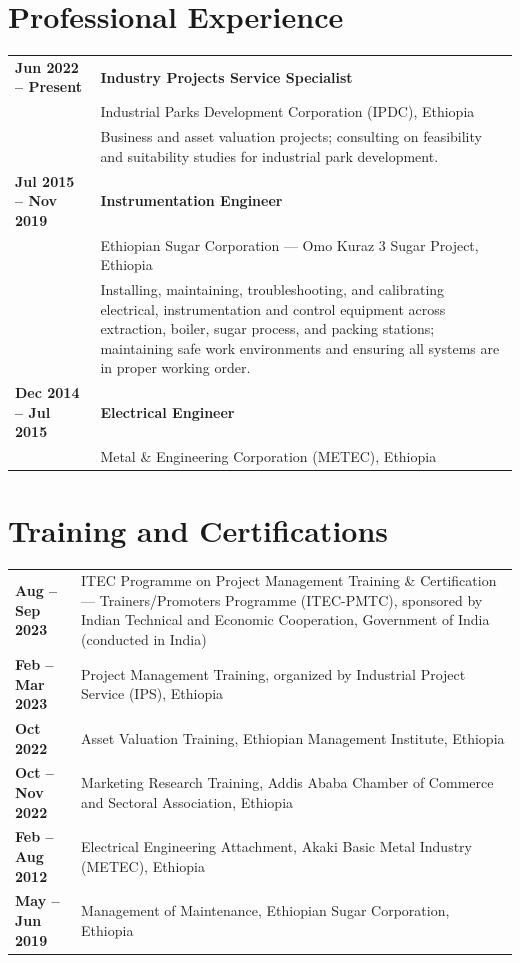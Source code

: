 \section*{Professional Experience}

\begin{tabular}{@{} p{3.5cm} p{10cm}}
\textbf{Jun 2022 -- Present} & \textbf{Industry Projects Service Specialist} \\
                              & Industrial Parks Development Corporation (IPDC), Ethiopia \\
                              & Business and asset valuation projects; consulting on feasibility and suitability studies for industrial park development. \\[0.4cm]
\textbf{Jul 2015 -- Nov 2019} & \textbf{Instrumentation Engineer} \\
                               & Ethiopian Sugar Corporation --- Omo Kuraz 3 Sugar Project, Ethiopia \\
                               & Installing, maintaining, troubleshooting, and calibrating electrical, instrumentation and control equipment across extraction, boiler, sugar process, and packing stations; maintaining safe work environments and ensuring all systems are in proper working order. \\[0.4cm]
\textbf{Dec 2014 -- Jul 2015} & \textbf{Electrical Engineer} \\
                               & Metal \& Engineering Corporation (METEC), Ethiopia \\
\end{tabular}

\section*{Training and Certifications}

\begin{tabular}{@{} p{3.5cm} p{10cm}}
\textbf{Aug -- Sep 2023} & ITEC Programme on Project Management Training \& Certification --- Trainers/Promoters Programme (ITEC-PMTC), sponsored by Indian Technical and Economic Cooperation, Government of India (conducted in India) \\[0.3cm]
\textbf{Feb -- Mar 2023} & Project Management Training, organized by Industrial Project Service (IPS), Ethiopia \\[0.3cm]
\textbf{Oct 2022}        & Asset Valuation Training, Ethiopian Management Institute, Ethiopia \\[0.3cm]
\textbf{Oct -- Nov 2022} & Marketing Research Training, Addis Ababa Chamber of Commerce and Sectoral Association, Ethiopia \\[0.3cm]
\textbf{Feb -- Aug 2012} & Electrical Engineering Attachment, Akaki Basic Metal Industry (METEC), Ethiopia \\[0.3cm]
\textbf{May -- Jun 2019} & Management of Maintenance, Ethiopian Sugar Corporation, Ethiopia \\
\end{tabular}

